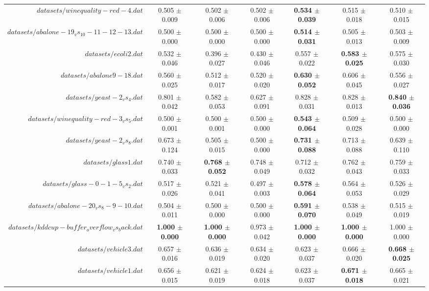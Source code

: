 \begin{table}[!ht]
{\begin{tabular}{r c c c c c c}
$datasets/winequality-red-4.dat$ & 0.505 $\pm$ 0.009 & 0.502 $\pm$ 0.006 & 0.502 $\pm$ 0.006 & \textbf{0.534 $\pm$ 0.039} & 0.515 $\pm$ 0.018 & 0.510 $\pm$ 0.015 \\
$datasets/abalone-19_vs_10-11-12-13.dat$ & 0.500 $\pm$ 0.000 & 0.500 $\pm$ 0.000 & 0.500 $\pm$ 0.000 & \textbf{0.514 $\pm$ 0.031} & 0.505 $\pm$ 0.013 & 0.503 $\pm$ 0.009 \\
$datasets/ecoli2.dat$ & 0.532 $\pm$ 0.046 & 0.396 $\pm$ 0.027 & 0.430 $\pm$ 0.046 & 0.557 $\pm$ 0.022 & \textbf{0.583 $\pm$ 0.025} & 0.575 $\pm$ 0.030 \\
$datasets/abalone9-18.dat$ & 0.560 $\pm$ 0.025 & 0.512 $\pm$ 0.017 & 0.520 $\pm$ 0.020 & \textbf{0.630 $\pm$ 0.052} & 0.606 $\pm$ 0.045 & 0.556 $\pm$ 0.027 \\
$datasets/yeast-2_vs_4.dat$ & 0.801 $\pm$ 0.042 & 0.582 $\pm$ 0.053 & 0.627 $\pm$ 0.091 & 0.828 $\pm$ 0.031 & 0.828 $\pm$ 0.013 & \textbf{0.840 $\pm$ 0.036} \\
$datasets/winequality-red-3_vs_5.dat$ & 0.500 $\pm$ 0.001 & 0.500 $\pm$ 0.001 & 0.500 $\pm$ 0.000 & \textbf{0.543 $\pm$ 0.064} & 0.509 $\pm$ 0.028 & 0.500 $\pm$ 0.000 \\
$datasets/yeast-2_vs_8.dat$ & 0.673 $\pm$ 0.124 & 0.505 $\pm$ 0.015 & 0.500 $\pm$ 0.000 & \textbf{0.731 $\pm$ 0.088} & 0.713 $\pm$ 0.088 & 0.639 $\pm$ 0.110 \\
$datasets/glass1.dat$ & 0.740 $\pm$ 0.033 & \textbf{0.768 $\pm$ 0.052} & 0.748 $\pm$ 0.049 & 0.712 $\pm$ 0.032 & 0.762 $\pm$ 0.043 & 0.759 $\pm$ 0.033 \\
$datasets/glass-0-1-5_vs_2.dat$ & 0.517 $\pm$ 0.026 & 0.521 $\pm$ 0.041 & 0.497 $\pm$ 0.003 & \textbf{0.578 $\pm$ 0.064} & 0.564 $\pm$ 0.053 & 0.526 $\pm$ 0.029 \\
$datasets/abalone-20_vs_8-9-10.dat$ & 0.504 $\pm$ 0.011 & 0.500 $\pm$ 0.000 & 0.500 $\pm$ 0.000 & \textbf{0.591 $\pm$ 0.070} & 0.538 $\pm$ 0.049 & 0.515 $\pm$ 0.019 \\
$datasets/kddcup-buffer_overflow_vs_back.dat$ & \textbf{1.000 $\pm$ 0.000} & \textbf{1.000 $\pm$ 0.000} & 0.973 $\pm$ 0.042 & \textbf{1.000 $\pm$ 0.000} & \textbf{1.000 $\pm$ 0.000} & 1.000 $\pm$ 0.000 \\
$datasets/vehicle3.dat$ & 0.657 $\pm$ 0.016 & 0.636 $\pm$ 0.019 & 0.634 $\pm$ 0.020 & 0.623 $\pm$ 0.037 & 0.666 $\pm$ 0.020 & \textbf{0.668 $\pm$ 0.025} \\
$datasets/vehicle1.dat$ & 0.656 $\pm$ 0.015 & 0.621 $\pm$ 0.019 & 0.624 $\pm$ 0.018 & 0.623 $\pm$ 0.037 & \textbf{0.671 $\pm$ 0.018} & 0.665 $\pm$ 0.021 \\

\end{tabular}}
\end{table}
